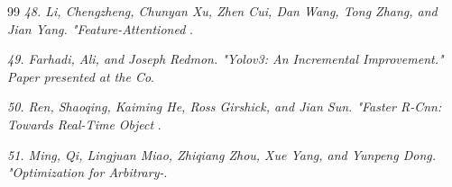 \documentclass[journal]{IEEEtran}
\begin{document}
\begin{thebibliography}{99}
\textit{48.	Li, Chengzheng, Chunyan Xu, Zhen Cui, Dan Wang, Tong Zhang, and Jian Yang. "Feature-Attentioned }.

\textit{49.	Farhadi, Ali, and Joseph Redmon. "Yolov3: An Incremental Improvement." Paper presented at the Co}.

\textit{50.	Ren, Shaoqing, Kaiming He, Ross Girshick, and Jian Sun. "Faster R-Cnn: Towards Real-Time Object }.

\textit{51.	Ming, Qi, Lingjuan Miao, Zhiqiang Zhou, Xue Yang, and Yunpeng Dong. "Optimization for Arbitrary-}.

\end{thebibliography}
\end{document}
